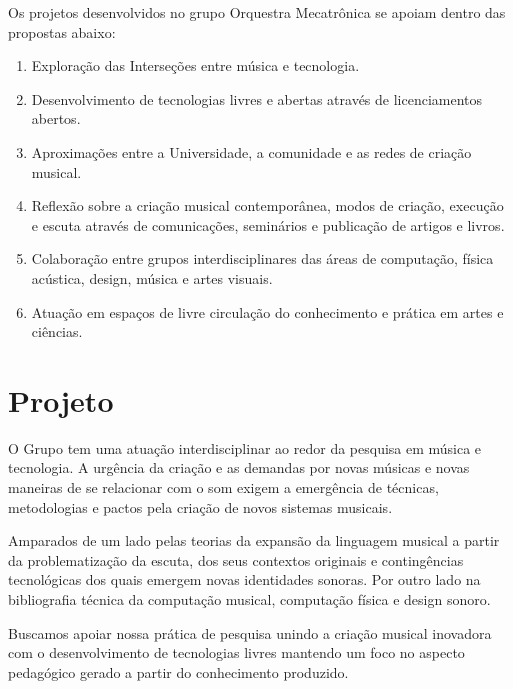 \documentclass[
	12pt,				%
	openright,			%
	twoside,			%
	a4paper,			%
	english,			%
	french,				%
	spanish,			%
	brazil,				%
	]{abntex2}
\begin{document}
Os projetos desenvolvidos no grupo Orquestra Mecatrônica se apoiam dentro das propostas abaixo:


\begin{enumerate}

\item Exploração das Interseções entre música e tecnologia.
\item Desenvolvimento de tecnologias livres e abertas através de licenciamentos abertos.
\item Aproximações entre a Universidade, a comunidade e as redes de criação musical.
\item Reflexão sobre a criação musical contemporânea, modos de criação, execução e escuta através de comunicações, seminários e publicação de artigos e livros.
\item Colaboração entre grupos interdisciplinares das áreas de computação, física acústica, design, música e artes visuais.
\item Atuação em espaços de livre circulação do conhecimento e prática em artes e ciências.




\end{enumerate}





\chapter{Projeto}


O Grupo tem uma atuação interdisciplinar ao redor da pesquisa em música e tecnologia. A urgência da criação e as demandas por novas músicas e novas maneiras de se relacionar com o som exigem a emergência de técnicas, metodologias e pactos pela criação de novos sistemas musicais. 

Amparados de um lado pelas teorias da expansão da linguagem musical a partir da problematização da escuta, dos seus contextos originais e contingências tecnológicas dos quais emergem novas identidades sonoras. Por outro lado na bibliografia técnica da computação musical, computação física e design sonoro. 

Buscamos apoiar nossa prática de pesquisa unindo a criação musical inovadora com o desenvolvimento de tecnologias livres mantendo um foco no aspecto pedagógico gerado a partir do conhecimento produzido. 
\end{document}
